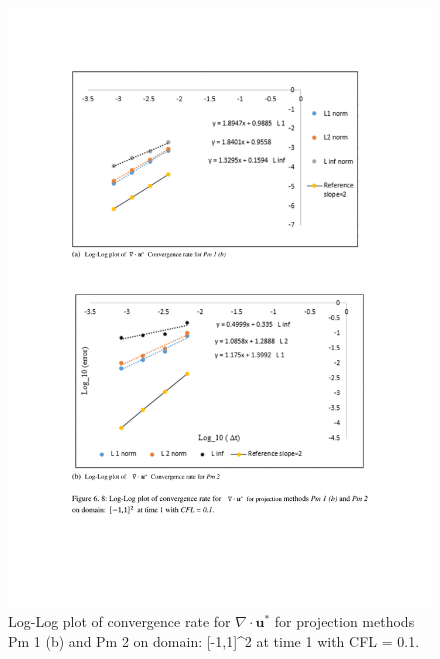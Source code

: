 \begin{figure}[H]
	\centering
	\includegraphics[scale=0.9]{figures/Pm2_Pm1b_div_uvstar_rate_t_1_cfl_0_1.pdf}
	\caption{Log-Log plot of convergence rate for $\nabla \cdot \textbf{u}^*$ for projection methods Pm 1 (b) and Pm 2 on domain: [-1,1]^2 at time 1 with CFL = 0.1. }\label{fig:6.8}
\end{figure}

